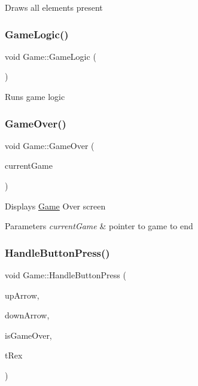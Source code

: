 Draws all elements present \mbox{\label{class_game_a362e7602108145252ff00a0d46a08570}} 
\subsubsection{\texorpdfstring{Game\+Logic()}{GameLogic()}}
{\footnotesize\ttfamily void Game\+::\+Game\+Logic (\begin{DoxyParamCaption}{ }\end{DoxyParamCaption})}

Runs game logic \mbox{\label{class_game_a8de397531462daf2c23c300054b0d9ea}} 
\subsubsection{\texorpdfstring{Game\+Over()}{GameOver()}}
{\footnotesize\ttfamily void Game\+::\+Game\+Over (\begin{DoxyParamCaption}\item[{\mbox{\hyperlink{class_game}{Game}} $\ast$}]{current\+Game }\end{DoxyParamCaption})}

Displays \mbox{\hyperlink{class_game}{Game}} Over screen 
\begin{DoxyParams}{Parameters}
{\em current\+Game} & pointer to game to end \\
\hline
\end{DoxyParams}
\mbox{\label{class_game_a5d149afcdf6ca2a3e232afc7d48ce51c}} 
\subsubsection{\texorpdfstring{Handle\+Button\+Press()}{HandleButtonPress()}}
{\footnotesize\ttfamily void Game\+::\+Handle\+Button\+Press (\begin{DoxyParamCaption}\item[{bool}]{up\+Arrow,  }\item[{bool}]{down\+Arrow,  }\item[{bool}]{is\+Game\+Over,  }\item[{\mbox{\hyperlink{class_t_rex}{T\+Rex}} $\ast$}]{t\+Rex }\end{DoxyParamCaption})}

